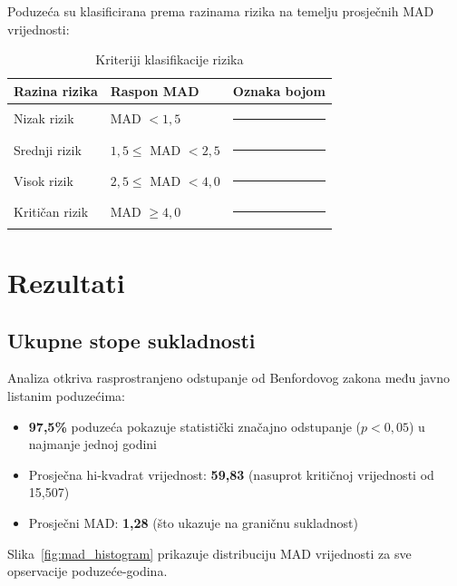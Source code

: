 \documentclass[12pt,a4paper]{article}
\begin{document}
Poduzeća su klasificirana prema razinama rizika na temelju prosječnih MAD vrijednosti:

\begin{table}[H]
\centering
\caption{Kriteriji klasifikacije rizika}
\label{tab:risk_levels}
\begin{tabular}{llc}
\toprule
\textbf{Razina rizika} & \textbf{Raspon MAD} & \textbf{Oznaka bojom} \\
\midrule
Nizak rizik & MAD $< 1{,}5$ & \textcolor{lowrisk}{\rule{1cm}{0.3cm}} \\
Srednji rizik & $1{,}5 \leq$ MAD $< 2{,}5$ & \textcolor{mediumrisk}{\rule{1cm}{0.3cm}} \\
Visok rizik & $2{,}5 \leq$ MAD $< 4{,}0$ & \textcolor{highrisk}{\rule{1cm}{0.3cm}} \\
Kritičan rizik & MAD $\geq 4{,}0$ & \textcolor{criticalrisk}{\rule{1cm}{0.3cm}} \\
\bottomrule
\end{tabular}
\end{table}

\newpage
\section{Rezultati}

\subsection{Ukupne stope sukladnosti}

Analiza otkriva rasprostranjeno odstupanje od Benfordovog zakona među javno listanim poduzećima:

\begin{itemize}
    \item \textbf{97,5\%} poduzeća pokazuje statistički značajno odstupanje ($p < 0{,}05$) u najmanje jednoj godini
    \item Prosječna hi-kvadrat vrijednost: \textbf{59,83} (nasuprot kritičnoj vrijednosti od 15,507)
    \item Prosječni MAD: \textbf{1,28} (što ukazuje na graničnu sukladnost)
\end{itemize}

Slika~\ref{fig:mad_histogram} prikazuje distribuciju MAD vrijednosti za sve opservacije poduzeće-godina.
\end{document}
